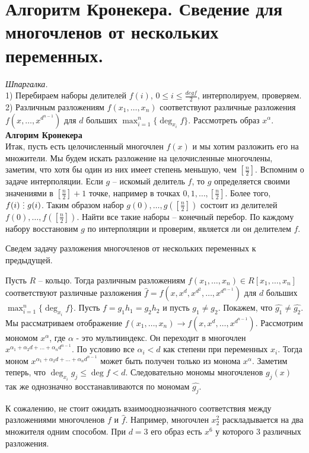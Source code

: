 \section{
 Алгоритм Кронекера. Сведение для многочленов от нескольких переменных.
}
{\it Шпаргалка.}\\
 1) Перебираем наборы делителей $f(i)$, $0 \le i \le \frac{deg f}{2}$, интерполируем, проверяем. 2) Различным разложениям $f(x_1,\dots,x_n)$ соответствуют различные разложения $f(x, \dots, x^{d^{n-1}})$ для $d$ больших $\max_{i=1}^n \{\deg_{x_i} f\}$. Рассмотреть образ $x^\alpha$.\\

{\bf Алгорим Кронекера}\\
Итак, пусть есть целочисленный многочлен $f(x)$ и мы хотим разложить его на множители. Мы будем искать разложение на целочисленные многочлены, заметим, что хотя бы один из них имеет степень меньшую, чем $[\frac{n}{2}]$. Вспомним о задаче интерполяции. Если $g$ -- искомый делитель $f$, то $g$ определяется своими значениями в $[\frac{n}{2}]+1$ точке, например в точках $0,1,\dots, [\frac{n}{2}]$. Более того, $f(i) \di g(i)$. Таким образом набор $g(0),\dots, g([\frac{n}{2}])$ состоит из делителей $f(0),\dots,f([\frac{n}{2}])$. Найти все такие наборы -- конечный перебор. По каждому набору восстановим $g$ по интерполяции и проверим, является ли он 
делителем $f$.

Сведем задачу разложения многочленов от нескольких переменных к предыдущей.

\thrm Пусть $R$ -- кольцо. Тогда различным разложениям $f(x_1,\dots,x_n)\in R[x_1,\dots,x_n]$   соответствуют различные разложения $\hat{f}=f(x, x^d, x^{d^2}, \dots, x^{d^{n-1}})$ для $d$ больших $\max_{i=1}^n \{\deg_{x_i} f\}$.
\proof Пусть $f=g_1h_1=g_2h_2$ и пусть $g_1\neq g_2$. Покажем, что $\hat{g_1}\neq \hat{g_2}$. Мы рассматриваем отображение $f(x_1, \dots, x_n) \rightarrow 
f(x, x^d,\dots, x^{d^{n-1}})$. Рассмотрим мономом $x^{\alpha}$, где $\alpha$ - это мультииндекс. Он переходит в многочлен $x^{\alpha_1+\alpha_2d+\dots+\alpha_n d^{n-1}}$. По условию все $\alpha_i<d$ как степени при переменных $x_i$. Тогда моном $x^{\alpha_1+\alpha_2d+\dots+\alpha_n d^{n-1}}$ может быть получен только из монома $x^{\alpha}$. Заметим теперь, что $\deg_{x_i} g_j \leq \deg f <d$. Следовательно мономы многочленов $g_j(x)$ так же однозначно восстанавливаются по мономам $\hat{g_j}$.
\endproof
\ethrm

К сожалению, не стоит ожидать взаимооднозначного соответствия между разложениями многочленов $f$ и $\hat{f}$. Например, многочлен $x_2^2$ раскладывается на два множителя одним способом. При $d=3$ его образ есть $x^6$ у которого 3 различных разложения.